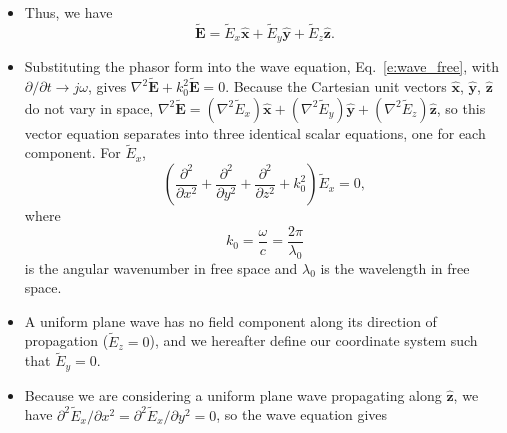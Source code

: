 \documentclass[11pt, oneside]{article}
\begin{document}
\begin{itemize}
\begin{center}
{\begin{minipage}{0.93\linewidth}
\begin{itemize}
		\end{itemize}
	\end{minipage}}
	\end{center}
	\item Thus, we have
	\begin{equation}
		\tilde{\mathbf{E}} = \tilde{E}_x\hat{\mathbf{x}} + \tilde{E}_y\hat{\mathbf{y}} + \tilde{E}_z\hat{\mathbf{z}}.
	\end{equation}
	\item Substituting the phasor form into the wave equation, Eq.~\eqref{e:wave_free}, with $\partial/\partial t \rightarrow j\omega$, gives $\nabla^2\tilde{\mathbf{E}} + k_0^2\tilde{\mathbf{E}} = 0$. Because the Cartesian unit vectors $\hat{\mathbf{x}}$, $\hat{\mathbf{y}}$, $\hat{\mathbf{z}}$ do not vary in space, $\nabla^2\tilde{\mathbf{E}} = (\nabla^2\tilde{E}_x)\hat{\mathbf{x}} + (\nabla^2\tilde{E}_y)\hat{\mathbf{y}} + (\nabla^2\tilde{E}_z)\hat{\mathbf{z}}$, so this vector equation separates into three identical scalar equations, one for each component. For $\tilde{E}_x$,
	\begin{equation}
		\left(\frac{\partial^2}{\partial x^2} + \frac{\partial^2}{\partial y^2} + \frac{\partial^2}{\partial z^2} + k_0^2\right)\tilde{E}_x = 0,
	\end{equation}
	where
	\begin{equation}
		k_0 = \frac{\omega}{c} = \frac{2\pi}{\lambda_0}
	\end{equation}
	is the angular wavenumber in free space and $\lambda_0$ is the wavelength in free space.
	\item A uniform plane wave has no field component along its direction of propagation ($\tilde{E}_z = 0$), and we hereafter define our coordinate system such that $\tilde{E}_y = 0$.
	\item Because we are considering a uniform plane wave propagating along $\hat{\mathbf{z}}$, we have $\partial^2 \tilde{E}_x/\partial x^2 = \partial^2 \tilde{E}_x/\partial y^2 = 0$, so the wave equation gives

\end{itemize}
\end{document}
